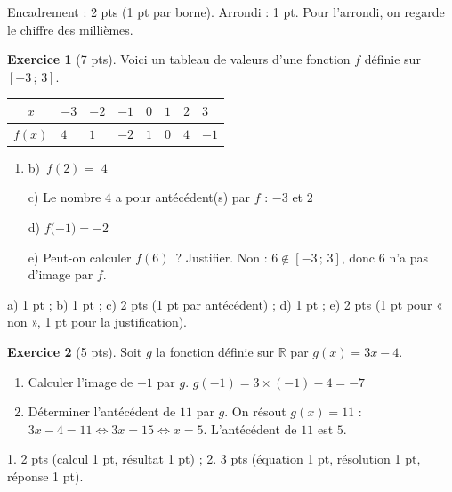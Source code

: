 \documentclass[12pt]{exam}
\theoremstyle{definition}
\newtheorem{exercice}{Exercice}
\begin{document}
\textcolor{sol}{\small Encadrement : 2 pts (1 pt par borne). Arrondi : 1 pt. Pour l'arrondi, on regarde le chiffre des millièmes.}
\vfill
\begin{exercice}[7 pts]
Voici un tableau de valeurs d'une fonction $f$ définie sur $[-3\,;\,3]$.
\begin{center}
\renewcommand{\arraystretch}{1.6}
\begin{tabular}{|c|*{7}{C{1.2cm}|}}
\hline
$x$ & $-3$ & $-2$ & $-1$ & $0$ & $1$ & $2$ & $3$ \\ \hline
$f(x)$ & $4$ & $1$ & $-2$ & $1$ & $0$ & $4$ & $-1$ \\ \hline
\end{tabular}
\end{center}
\begin{enumerate}[label=\alph*), itemsep=1.2em, topsep=0.6em]
\item {}b)~$f(2) = $ \textcolor{sol}{$4$}
\item[c)] Le nombre $4$ a pour antécédent(s) par $f$ : \textcolor{sol}{$-3$ et $2$}
\item[d)] $f($\textcolor{sol}{$-1$}$) = -2$
\item[e)] Peut-on calculer $f(6)$~? Justifier. \textcolor{sol}{Non : $6\notin[-3\,;\,3]$, donc $6$ n'a pas d'image par $f$.}
\end{enumerate}
\textcolor{sol}{\small a) 1 pt ; b) 1 pt ; c) 2 pts (1 pt par antécédent) ; d) 1 pt ; e) 2 pts (1 pt pour « non », 1 pt pour la justification).}
\end{exercice}

\vfill
\begin{exercice}[5 pts]
Soit $g$ la fonction définie sur $\mathbb{R}$ par $g(x) = 3x-4$.
\begin{enumerate}[label=\arabic*., itemsep=1.2em, topsep=0.6em]
\item Calculer l'image de $-1$ par $g$. \hfill \textcolor{sol}{$g(-1)=3\times(-1)-4=-7$} \hspace*{1cm}
\item Déterminer l'antécédent de $11$ par $g$. \textcolor{sol}{On résout $g(x)=11$ : $3x-4=11 \iff 3x=15 \iff x=5$. L'antécédent de $11$ est $5$.}
\end{enumerate}
\textcolor{sol}{\small 1. 2 pts (calcul 1 pt, résultat 1 pt) ; 2. 3 pts (équation 1 pt, résolution 1 pt, réponse 1 pt).}
\end{exercice}
\end{document}
